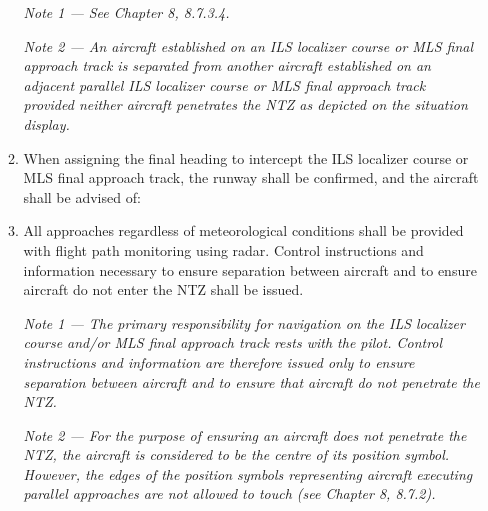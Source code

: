 \documentclass[../main.tex]{subfiles}
\begin{document}
\begin{enumerate}[itemsep=0.2cm]
\begin{enumerate}
            \textit{Note 1 --- See Chapter 8, 8.7.3.4.}

            \textit{Note 2 --- An aircraft established on an ILS localizer course or MLS final approach track is separated from another aircraft established on an adjacent parallel ILS localizer course or MLS final approach track provided neither aircraft penetrates the NTZ as depicted on the situation display.}

            \item When assigning the final heading to intercept the ILS localizer course or MLS final approach track, the runway shall be confirmed, and the aircraft shall be advised of:


            \item All approaches regardless of meteorological conditions shall be provided with flight path monitoring using radar. Control instructions and information necessary to ensure separation between aircraft and to ensure aircraft do not enter the NTZ shall be issued.

            \textit{Note 1 --- The primary responsibility for navigation on the ILS localizer course and/or MLS final approach track rests with the pilot. Control instructions and information are therefore issued only to ensure separation between aircraft and to ensure that aircraft do not penetrate the NTZ.}

            \textit{Note 2 --- For the purpose of ensuring an aircraft does not penetrate the NTZ, the aircraft is considered to be the centre of its position symbol. However, the edges of the position symbols representing aircraft executing parallel approaches are not allowed to touch (see Chapter 8, 8.7.2).}


\end{enumerate}
\end{enumerate}
\end{document}
